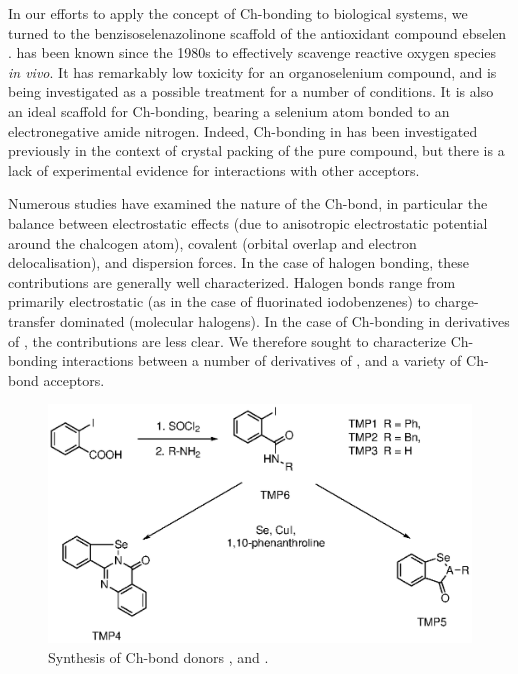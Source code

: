 \begin{refsection}
In our efforts to apply the concept of Ch-bonding to biological systems, we turned to the benzisoselenazolinone scaffold of the antioxidant compound ebselen .
 has been known since the 1980s to effectively scavenge reactive oxygen species \emph{in vivo}.\autocite{Muller1984}
It has remarkably low toxicity for an organoselenium compound, and is being investigated as a possible treatment for a number of conditions.\autocite{Schewe1995,Kil2007,Singh2013,Parnham2000}
It is also an ideal scaffold for Ch-bonding, bearing a selenium atom bonded to an electronegative amide nitrogen.
Indeed, Ch-bonding in  has been investigated previously in the context of crystal packing of the pure compound, but there is a lack of experimental evidence for interactions with other acceptors.\autocite{Thomas2015}

Numerous studies have examined the nature of the Ch-bond, in particular the balance between electrostatic effects (due to anisotropic electrostatic potential around the chalcogen atom), covalent (orbital overlap and electron delocalisation), and dispersion forces.\autocite{Oliveira2017,Pascoe2017,DeVleeschouwer2017,Kolar2016,Gleiter2018}
In the case of halogen bonding, these contributions are generally well characterized.
Halogen bonds range from primarily electrostatic (as in the case of fluorinated iodobenzenes\autocite{Prasang2009}) to charge-transfer dominated (molecular halogens\autocite{Mulliken1950}).
In the case of Ch-bonding in derivatives of , the contributions are less clear.
We therefore sought to characterize Ch-bonding interactions between a number of derivatives of , and a variety of Ch-bond acceptors.

\begin{figure}
  \centering
  \includegraphics[scale=0.8]{Figures/catalytic-synthesis.eps}
  \caption{Synthesis of Ch-bond donors ,  and .}
  \label{fig:synthesis}
\end{figure}


\end{refsection}

